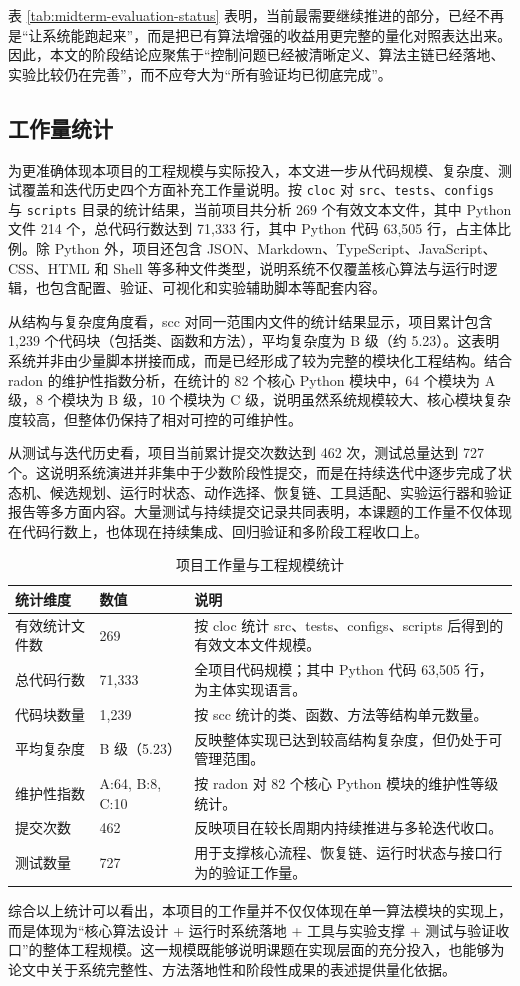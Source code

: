 表 \ref{tab:midterm-evaluation-status} 表明，当前最需要继续推进的部分，已经不再是“让系统能跑起来”，而是把已有算法增强的收益用更完整的量化对照表达出来。因此，本文的阶段结论应聚焦于“控制问题已经被清晰定义、算法主链已经落地、实验比较仍在完善”，而不应夸大为“所有验证均已彻底完成”。

\subsection{工作量统计}

为更准确体现本项目的工程规模与实际投入，本文进一步从代码规模、复杂度、测试覆盖和迭代历史四个方面补充工作量说明。按 \texttt{cloc} 对 \texttt{src}、\texttt{tests}、\texttt{configs} 与 \texttt{scripts} 目录的统计结果，当前项目共分析 269 个有效文本文件，其中 Python 文件 214 个，总代码行数达到 71,333 行，其中 Python 代码 63,505 行，占主体比例。除 Python 外，项目还包含 JSON、Markdown、TypeScript、JavaScript、CSS、HTML 和 Shell 等多种文件类型，说明系统不仅覆盖核心算法与运行时逻辑，也包含配置、验证、可视化和实验辅助脚本等配套内容。

从结构与复杂度角度看，scc 对同一范围内文件的统计结果显示，项目累计包含 1,239 个代码块（包括类、函数和方法），平均复杂度为 B 级（约 5.23）。这表明系统并非由少量脚本拼接而成，而是已经形成了较为完整的模块化工程结构。结合 radon 的维护性指数分析，在统计的 82 个核心 Python 模块中，64 个模块为 A 级，8 个模块为 B 级，10 个模块为 C 级，说明虽然系统规模较大、核心模块复杂度较高，但整体仍保持了相对可控的可维护性。

从测试与迭代历史看，项目当前累计提交次数达到 462 次，测试总量达到 727 个。这说明系统演进并非集中于少数阶段性提交，而是在持续迭代中逐步完成了状态机、候选规划、运行时状态、动作选择、恢复链、工具适配、实验运行器和验证报告等多方面内容。大量测试与持续提交记录共同表明，本课题的工作量不仅体现在代码行数上，也体现在持续集成、回归验证和多阶段工程收口上。

\begin{table}[htbp]
	\centering
	\caption{项目工作量与工程规模统计}
	\label{tab:midterm-workload}
	\renewcommand{\arraystretch}{1.22}
	\begin{tabularx}{\textwidth}{p{3.2cm}p{2.8cm}>{\raggedright\arraybackslash}X}
		\toprule
		统计维度 & 数值 & 说明 \\
		\midrule
		有效统计文件数 & 269 & 按 cloc 统计 src、tests、configs、scripts 后得到的有效文本文件规模。 \\
		总代码行数 & 71,333 & 全项目代码规模；其中 Python 代码 63,505 行，为主体实现语言。 \\
		代码块数量 & 1,239 & 按 scc 统计的类、函数、方法等结构单元数量。 \\
		平均复杂度 & B 级（5.23） & 反映整体实现已达到较高结构复杂度，但仍处于可管理范围。 \\
		维护性指数 & A:64, B:8, C:10 & 按 radon 对 82 个核心 Python 模块的维护性等级统计。 \\
		提交次数 & 462 & 反映项目在较长周期内持续推进与多轮迭代收口。 \\
		测试数量 & 727 & 用于支撑核心流程、恢复链、运行时状态与接口行为的验证工作量。 \\
		\bottomrule
	\end{tabularx}
\end{table}

综合以上统计可以看出，本项目的工作量并不仅仅体现在单一算法模块的实现上，而是体现为“核心算法设计 + 运行时系统落地 + 工具与实验支撑 + 测试与验证收口”的整体工程规模。这一规模既能够说明课题在实现层面的充分投入，也能够为论文中关于系统完整性、方法落地性和阶段性成果的表述提供量化依据。
